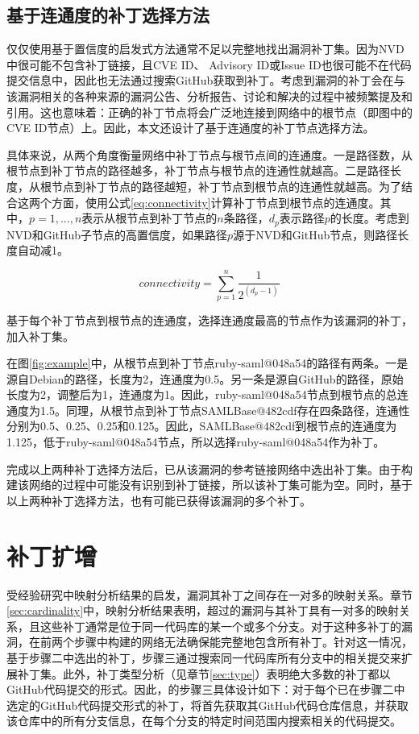 \subsection{基于连通度的补丁选择方法}
仅仅使用基于置信度的启发式方法通常不足以完整地找出漏洞补丁集。因为NVD中很可能不包含补丁链接，且CVE ID、 Advisory ID或Issue ID也很可能不在代码提交信息中，因此也无法通过搜索GitHub获取到补丁。考虑到漏洞的补丁会在与该漏洞相关的各种来源的漏洞公告、分析报告、讨论和解决的过程中被频繁提及和引用。这也意味着：正确的补丁节点将会广泛地连接到网络中的根节点（即图中的CVE ID节点）上。因此，本文还设计了基于连通度的补丁节点选择方法。

具体来说，\tool 从两个角度衡量网络中补丁节点与根节点间的连通度。一是路径数，从根节点到补丁节点的路径越多，补丁节点与根节点的连通性就越高。二是路径长度，从根节点到补丁节点的路径越短，补丁节点到根节点的连通性就越高。为了结合这两个方面，\tool 使用公式\ref{eq:connectivity}计算补丁节点到根节点的连通度。其中，$ p = 1, ..., n$表示从根节点到补丁节点的$n$条路径，$d_p$表示路径$p$的长度。考虑到NVD和GitHub子节点的高置信度，如果路径$p$源于NVD和GitHub节点，则路径长度自动减1。

\begin{equation}\label{eq:connectivity}
    connectivity =\sum_{p=1}^{n}   \frac{1}{2^{({d}_{p} -1)}}
\end{equation}

基于每个补丁节点到根节点的连通度，\tool 选择连通度最高的节点作为该漏洞的补丁，加入补丁集。

\begin{exmp}
在图\ref{fig:example}中，从根节点到补丁节点ruby-saml@048a54的路径有两条。一是源自Debian的路径，长度为2，连通度为0.5。另一条是源自GitHub的路径，原始长度为2，调整后为1，连通度为1。因此，ruby-saml@048a54节点到根节点的总连通度为1.5。同理，从根节点到补丁节点SAMLBase@482cdf存在四条路径，连通性分别为0.5、0.25、0.25和0.125。因此，SAMLBase@482cdf到根节点的连通度为1.125，低于ruby-saml@048a54节点，所以\tool 选择ruby-saml@048a54作为补丁。%
\end{exmp}

完成以上两种补丁选择方法后，\tool 已从该漏洞的参考链接网络中选出补丁集。由于构建该网络的过程中可能没有识别到补丁链接，所以该补丁集可能为空。同时，基于以上两种补丁选择方法，\tool 也有可能已获得该漏洞的多个补丁。


\section{补丁扩增}
受经验研究中映射分析结果的启发，漏洞其补丁之间存在一对多的映射关系。章节\ref{sec:cardinality}中，映射分析结果表明，超过的漏洞与其补丁具有一对多的映射关系，且这些补丁通常是位于同一代码库的某一个或多个分支。对于这种多补丁的漏洞，\tool 在前两个步骤中构建的网络无法确保能完整地包含所有补丁。针对这一情况，基于步骤二中选出的补丁，步骤三通过搜索同一代码库所有分支中的相关提交来扩展补丁集。此外，补丁类型分析（见章节\ref{sec:type}）表明绝大多数的补丁都以GitHub代码提交的形式。因此，\tool 的步骤三具体设计如下：对于每个已在步骤二中选定的GitHub代码提交形式的补丁，\tool 将首先获取其GitHub代码仓库信息，并获取该仓库中的所有分支信息，在每个分支的特定时间范围内搜索相关的代码提交。

